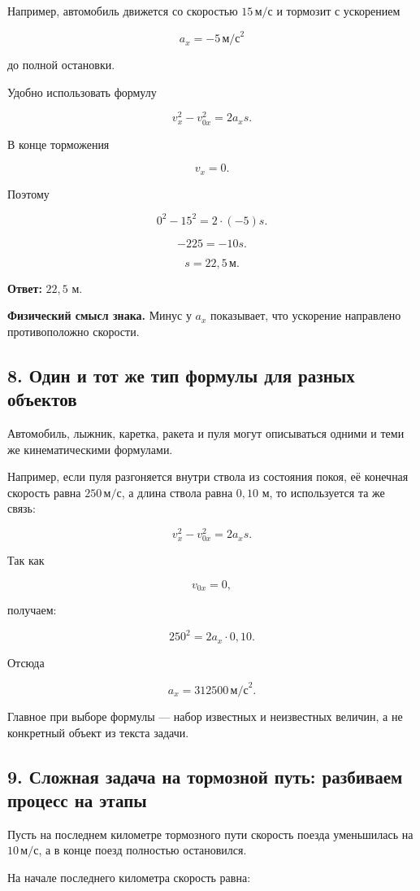 \documentclass[a4paper,12pt]{article}
\newcommand{\ms}{\,\text{м/с}}
\newcommand{\mss}{\,\text{м/с}^2}
\newcommand{\important}[1]{\textcolor{darkaccent}{\textbf{#1}}}
\begin{document}
Например, автомобиль движется со скоростью $15\ms$
и тормозит с ускорением

\[
a_x=-5\mss
\]

до полной остановки.

Удобно использовать формулу

\[
v_x^2-v_{0x}^2=2a_xs.
\]

В конце торможения

\[
v_x=0.
\]

Поэтому

\[
0^2-15^2
=
2\cdot(-5)s.
\]

\[
-225=-10s.
\]

\[
s=22{,}5\,\text{м}.
\]

\textbf{Ответ:}
$22{,}5$ м.

\important{Физический смысл знака.}
Минус у $a_x$ показывает,
что ускорение направлено противоположно скорости.

\subsection*{8. Один и тот же тип формулы для разных объектов}

Автомобиль, лыжник, каретка, ракета и пуля
могут описываться одними и теми же кинематическими формулами.

Например, если пуля разгоняется внутри ствола
из состояния покоя,
её конечная скорость равна $250\ms$,
а длина ствола равна $0{,}10$ м,
то используется та же связь:

\[
v_x^2-v_{0x}^2=2a_xs.
\]

Так как

\[
v_{0x}=0,
\]

получаем:

\[
250^2
=
2a_x\cdot0{,}10.
\]

Отсюда

\[
a_x=312500\mss.
\]

Главное при выборе формулы --- набор известных и неизвестных величин,
а не конкретный объект из текста задачи.

\subsection*{9. Сложная задача на тормозной путь: разбиваем процесс на этапы}

Пусть на последнем километре тормозного пути
скорость поезда уменьшилась на $10\ms$,
а в конце поезд полностью остановился.

На начале последнего километра скорость равна:
\end{document}
